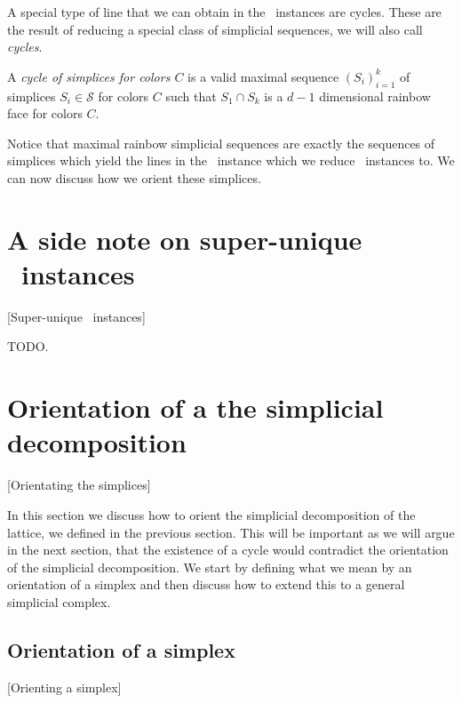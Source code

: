 A special type of line that we can obtain in the \EndOfLine\ instances are cycles. These are the result of reducing a special class of simplicial sequences, we will also call \emph{cycles}.

\begin{definition}[Cycle]
	A \emph{cycle of simplices for colors $C$} is a valid maximal sequence $\left(S_i\right)_{i=1}^{k}$ of simplices $S_i \in \mathcal{S}$ for colors $C$ such that $S_1 \cap S_k$ is a $d-1$ dimensional rainbow face for colors $C$.
\end{definition}

Notice that maximal rainbow simplicial sequences are exactly the sequences of simplices which yield the lines in the \EndOfLine\ instance which we reduce \Sperner\ instances to. We can now discuss how we orient these simplices.

\section{A side note on super-unique \Tarski\ instances}[Super-unique \Tarski\ instances]

TODO.

\section{Orientation of a the simplicial decomposition}[Orientating the simplices]

In this section we discuss how to orient the simplicial decomposition of the lattice, we defined in the previous section. This will be important as we will argue in the next section, that the existence of a cycle would contradict the orientation of the simplicial decomposition. We start by defining what we mean by an orientation of a simplex and then discuss how to extend this to a general simplicial complex.

\subsection{Orientation of a simplex}[Orienting a simplex]
\label{sec:orientation_of_simplex}

